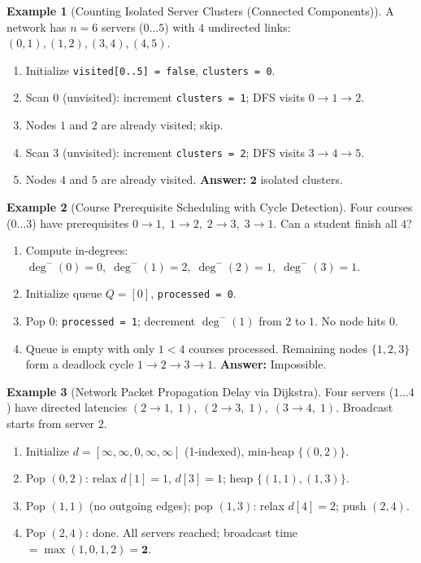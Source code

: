 \documentclass[11pt,a4paper]{article}
\theoremstyle{definition}
\newtheorem{example}{Example}[section]
\begin{document}
\begin{example}[Counting Isolated Server Clusters (Connected Components)]
A network has $n = 6$ servers ($0 \dots 5$) with $4$ undirected links: $(0,1), (1,2), (3,4), (4,5)$.
\begin{enumerate}
    \item Initialize \texttt{visited[0..5] = false}, \texttt{clusters = 0}.
    \item Scan $0$ (unvisited): increment \texttt{clusters = 1}; DFS visits $0 \to 1 \to 2$.
    \item Nodes $1$ and $2$ are already visited; skip.
    \item Scan $3$ (unvisited): increment \texttt{clusters = 2}; DFS visits $3 \to 4 \to 5$.
    \item Nodes $4$ and $5$ are already visited. \textbf{Answer:} $\mathbf{2}$ isolated clusters.
\end{enumerate}
\end{example}

\begin{example}[Course Prerequisite Scheduling with Cycle Detection]
Four courses ($0 \dots 3$) have prerequisites $0 \to 1,\; 1 \to 2,\; 2 \to 3,\; 3 \to 1$. Can a student finish all $4$?
\begin{enumerate}
    \item Compute in-degrees: $\deg^-(0) = 0,\; \deg^-(1) = 2,\; \deg^-(2) = 1,\; \deg^-(3) = 1$.
    \item Initialize queue $Q = [0]$, \texttt{processed = 0}.
    \item Pop $0$: \texttt{processed = 1}; decrement $\deg^-(1)$ from $2$ to $1$. No node hits $0$.
    \item Queue is empty with only $1 < 4$ courses processed. Remaining nodes $\{1, 2, 3\}$ form a deadlock cycle $1 \to 2 \to 3 \to 1$. \textbf{Answer:} Impossible.
\end{enumerate}
\end{example}

\begin{example}[Network Packet Propagation Delay via Dijkstra]
Four servers ($1 \dots 4$) have directed latencies $(2 \to 1,\; 1),\; (2 \to 3,\; 1),\; (3 \to 4,\; 1)$. Broadcast starts from server $2$.
\begin{enumerate}
    \item Initialize $d = [\infty, \infty, 0, \infty, \infty]$ (1-indexed), min-heap $\{(0, 2)\}$.
    \item Pop $(0, 2)$: relax $d[1] = 1$, $d[3] = 1$; heap $\{(1, 1), (1, 3)\}$.
    \item Pop $(1, 1)$ (no outgoing edges); pop $(1, 3)$: relax $d[4] = 2$; push $(2, 4)$.
    \item Pop $(2, 4)$: done. All servers reached; broadcast time $= \max(1, 0, 1, 2) = \mathbf{2}$.
\end{enumerate}
\end{example}
\end{document}
